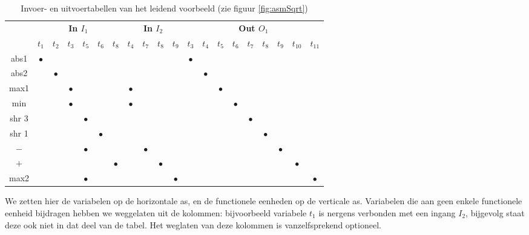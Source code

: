 \begin{table}[hbt]
\centering
\small{\begin{tabular}{c|cccccc|cccc|ccccccccc}
	&\multicolumn{6}{c|}{\bf In $I_1$}		&\multicolumn{4}{c|}{\bf In $I_2$}&\multicolumn{9}{c}{\bf Out $O_1$}\\
	&$t_1$	&$t_2$	&$t_3$	&$t_5$	&$t_6$	&$t_8$	&$t_4$	&$t_7$	&$t_8$	&$t_9$	&$t_3$	&$t_4$	&$t_5$	&$t_6$	&$t_7$	&$t_8$	&$t_9$	&$t_{10}$&$t_{11}$\\\hline
abs1	&$\bullet$&	&	&	&	&	&	&	&	&	&$\bullet$&	&	&	&	&	&	&	&\\
abs2	&	&$\bullet$&	&	&	&	&	&	&	&	&	&$\bullet$&	&	&	&	&	&	&\\
max1	&	&	&$\bullet$&	&	&	&$\bullet$&	&	&	&	&	&$\bullet$&	&	&	&	&	&\\
min	&	&	&$\bullet$&	&	&	&$\bullet$&	&	&	&	&	&	&$\bullet$&	&	&	&	&\\
shr 3	&	&	&	&$\bullet$&	&	&	&	&	&	&	&	&	&	&$\bullet$&	&	&	&\\
shr 1	&	&	&	&	&$\bullet$&	&	&	&	&	&	&	&	&	&	&$\bullet$&	&	&\\
$-$	&	&	&	&$\bullet$&	&	&	&$\bullet$&	&	&	&	&	&	&	&	&$\bullet$&	&\\
$+$	&	&	&	&	&	&$\bullet$&	&	&$\bullet$&	&	&	&	&	&	&	&	&$\bullet$&\\
max2	&	&	&	&$\bullet$&	&	&	&	&	&$\bullet$&	&	&	&	&	&	&	&	&$\bullet$
\end{tabular}}
\caption{Invoer- en uitvoertabellen van het leidend voorbeeld (zie figuur \ref{fig:asmSqrt})}
\label{tbl:inputtableexample}
\end{table}
We zetten hier de variabelen op de horizontale as, en de functionele eenheden op de verticale as. Variabelen die aan geen enkele functionele eenheid bijdragen hebben we weggelaten uit de kolommen: bijvoorbeeld variabele $t_1$ is nergens verbonden met een ingang $I_2$, bijgevolg staat deze ook niet in dat deel van de tabel. Het weglaten van deze kolommen is vanzelfsprekend optioneel.
